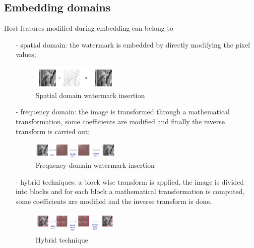 \subsection{Embedding domains}
Host features modified during embedding can
belong to 
\begin{itemize}
\item[-] spatial domain: the watermark is embedded by directly modifying the pixel values;
\begin{figure}[h!]
\centering
\includegraphics[width=0.4\textwidth]{./img/domain1.png}
\caption{\small{Spatial domain watermark insertion}}
\label{fig:dom1}
\end{figure}
\item[-] frequency domain: the image is transformed through a mathematical transformation, some coefficients are modified and finally the inverse transform is carried out;
\begin{figure}[h!]
\centering
\includegraphics[width=0.4\textwidth]{./img/domain2.png}
\caption{\small{Frequency domain watermark insertion}}
\label{fig:dom2}
\end{figure}
\item[-] hybrid techniques: a block wise transform is applied, the image is divided
into blocks and for each block a mathematical transformation is computed, some coefficients are modified and the inverse transform is done.
\begin{figure}[h!]
\centering
\includegraphics[width=0.4\textwidth]{./img/domain3.png}
\caption{\small{Hybrid technique}}
\label{fig:dom3}
\end{figure}
\end{itemize}

